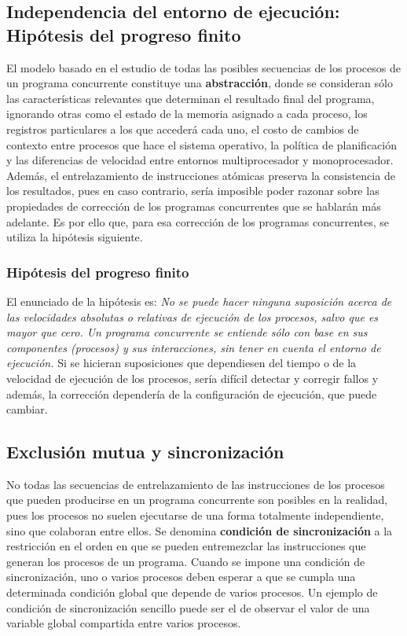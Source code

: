 \subsection{Independencia del entorno de ejecución: Hipótesis del progreso finito}\label{subsec:concurrentprogfinit}
El modelo basado en el estudio de todas las posibles secuencias de los procesos de un programa concurrente constituye una \textbf{abstracción}, donde se consideran sólo las características relevantes que determinan el resultado final del programa, ignorando otras como el estado de la memoria asignado a cada proceso, los registros particulares a los que accederá cada uno, el costo de cambios de contexto entre procesos que hace el sistema operativo, la política de planificación y las diferencias de velocidad entre entornos multiprocesador y monoprocesador. Además, el entrelazamiento de instrucciones atómicas preserva la consistencia de los resultados, pues en caso contrario, sería imposible poder razonar sobre las propiedades de corrección de los programas concurrentes que se hablarán más adelante. Es por ello que, para esa corrección de los programas concurrentes, se utiliza la hipótesis siguiente.

\subsubsection{Hipótesis del progreso finito}\label{subsubsec:concurrentprogfinithip}
El enunciado de la hipótesis es: \textit{No se puede hacer ninguna suposición acerca de las velocidades absolutas o relativas de ejecución de los procesos, salvo que es mayor que cero. Un programa concurrente se entiende sólo con base en sus componentes (procesos) y sus interacciones, sin tener en cuenta el entorno de ejecución.} Si se hicieran suposiciones que dependiesen del tiempo o de la velocidad de ejecución de los procesos, sería difícil detectar y corregir fallos y además, la corrección dependería de la configuración de ejecución, que puede cambiar.

\subsection{Exclusión mutua y sincronización}\label{subsec:concurrentexclusion}
No todas las secuencias de entrelazamiento de las instrucciones de los procesos que pueden producirse en un programa concurrente son posibles en la realidad, pues los procesos no suelen ejecutarse de una forma totalmente independiente, sino que colaboran entre ellos. Se denomina \textbf{condición de sincronización} a la restricción en el orden en que se pueden entremezclar las instrucciones que generan los procesos de un programa. Cuando se impone una condición de sincronización, uno o varios procesos deben esperar a que se cumpla una determinada condición global que depende de varios procesos. Un ejemplo de condición de sincronización sencillo puede ser el de observar el valor de una variable global compartida entre varios procesos.

